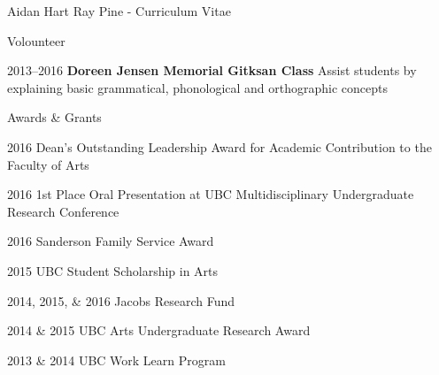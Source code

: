 \documentclass[12pt]{letter}
\begin{document}
\begin{cv}{ Aidan Hart Ray Pine  \space - \space   Curriculum Vitae}
\begin{cvlist}{Volounteer}
            \item[2013--2016] \textbf{Doreen Jensen Memorial Gitksan Class}
            \newline Assist students by explaining basic grammatical, phonological and orthographic concepts
        \end{cvlist}
        \begin{cvlist}{Awards \& Grants}
            \item[2016] Dean's Outstanding Leadership Award for Academic Contribution to the Faculty of Arts
            \item[2016] 1st Place Oral Presentation at UBC Multidisciplinary Undergraduate Research Conference
            \item[2016] Sanderson Family Service Award 
            \item[2015] UBC Student Scholarship in Arts
            \item[2014, 2015, \& 2016]	Jacobs Research Fund
            \item[2014 \& 2015]	UBC Arts Undergraduate Research Award
            \item[2013 \& 2014]	UBC Work Learn Program
        \end{cvlist}
    \end{cv}
    
    
\end{document}
